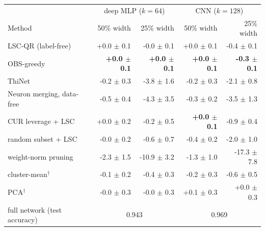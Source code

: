 \begin{tabular}{lrrrr}\toprule
 & \multicolumn{2}{c}{deep MLP ($k{=}64$)} & \multicolumn{2}{c}{CNN ($k{=}128$)}\\
Method & 50\% width & 25\% width & 50\% width & 25\% width\\\midrule
LSC-QR (label-free) & +0.0 $\pm$ 0.1 & -0.0 $\pm$ 0.1 & +0.0 $\pm$ 0.1 & -0.4 $\pm$ 0.1\\
OBS-greedy \cite{hassibi1993,dong2017} & \textbf{+0.0 $\pm$ 0.1} & \textbf{+0.0 $\pm$ 0.1} & \textbf{+0.0 $\pm$ 0.1} & \textbf{-0.3 $\pm$ 0.1}\\
ThiNet \cite{luo2017} & -0.2 $\pm$ 0.3 & -3.8 $\pm$ 1.6 & -0.2 $\pm$ 0.3 & -2.1 $\pm$ 0.8\\
Neuron merging, data-free \cite{srinivas2015,kim2020} & -0.5 $\pm$ 0.4 & -4.3 $\pm$ 3.5 & -0.3 $\pm$ 0.2 & -3.5 $\pm$ 1.3\\
CUR leverage + LSC \cite{mahoney2009} & +0.0 $\pm$ 0.2 & -0.2 $\pm$ 0.5 & \textbf{+0.0 $\pm$ 0.1} & -0.9 $\pm$ 0.4\\
random subset + LSC & -0.0 $\pm$ 0.2 & -0.6 $\pm$ 0.7 & -0.4 $\pm$ 0.2 & -2.0 $\pm$ 1.0\\
weight-norm pruning \cite{han2015} & -2.3 $\pm$ 1.5 & -10.9 $\pm$ 3.2 & -1.3 $\pm$ 1.0 & -17.3 $\pm$ 7.8\\
cluster-mean$^\dagger$ & -0.1 $\pm$ 0.2 & -0.4 $\pm$ 0.3 & -0.2 $\pm$ 0.3 & -0.6 $\pm$ 0.5\\
PCA$^\dagger$ & -0.0 $\pm$ 0.3 & -0.0 $\pm$ 0.3 & +0.1 $\pm$ 0.3 & +0.0 $\pm$ 0.3\\
\midrule
full network (test accuracy) & \multicolumn{2}{c}{0.943} & \multicolumn{2}{c}{0.969}\\
\bottomrule\end{tabular}
